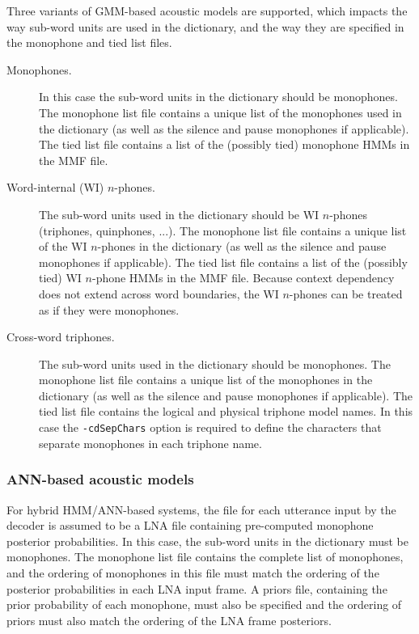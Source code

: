 \documentclass[a4paper,12pt]{report}
\begin{document}
Three variants of GMM-based acoustic models are supported, which impacts the way sub-word units are used in the dictionary, and the way they are specified in the monophone and tied list files.

\begin{description}
\item[Monophones.] In this case the sub-word units in the dictionary should be monophones. The monophone list file contains a unique list of the monophones used in the dictionary (as well as the silence and pause monophones if applicable). The tied list file contains a list of the (possibly tied) monophone HMMs in the MMF file.
\item[Word-internal (WI) $n$-phones.] The sub-word units used in the dictionary should be WI $n$-phones (triphones, quinphones, ...). The monophone list file contains a unique list of the WI $n$-phones in the dictionary (as well as the silence and pause monophones if applicable). The tied list file contains a list of the (possibly tied) WI $n$-phone HMMs in the MMF file. Because context dependency does not extend across word boundaries, the WI $n$-phones can be treated as if they were monophones.
\item[Cross-word triphones.] The sub-word units used in the dictionary should be monophones. The monophone list file contains a unique list of the monophones in the dictionary (as well as the silence and pause monophones if applicable). The tied list file contains the logical and physical triphone model names. In this case the {\tt -cdSepChars} option is required to define the characters that separate monophones in each triphone name.
\end{description}


\subsubsection{ANN-based acoustic models}

For hybrid HMM/ANN-based systems, the file for each utterance input by the decoder is assumed to be a LNA file containing pre-computed monophone posterior probabilities. In this case, the sub-word units in the dictionary must be monophones. The monophone list file contains the complete list of monophones, and the ordering of monophones in this file must match the ordering of the posterior probabilities in each LNA input frame. A priors file, containing the prior probability of each monophone, must also be specified and the ordering of priors must also match the ordering of the LNA frame posteriors.
\end{document}
